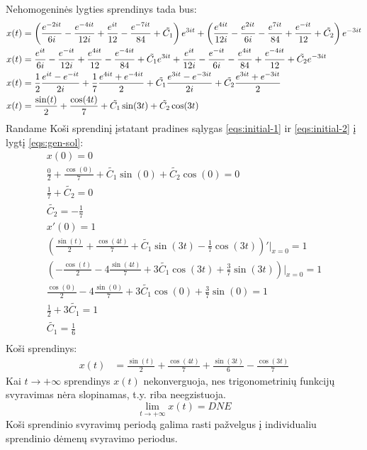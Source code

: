 \documentclass[11pt]{article}
\begin{document}
Nehomogeninės lygties sprendinys tada bus:
\begin{align}
x(t)&=\left(\frac{e^{-2it}}{6i}-\frac{e^{-4it}}{12i}+\frac{e^{it}}{12}-\frac{e^{-7it}}{84}+\tilde{C_1}\right)e^{3it}
+\left(\frac{e^{4it}}{12i}-\frac{e^{2it}}{6i}-\frac{e^{7it}}{84}+\frac{e^{-it}}{12}+\tilde{C_2}\right)e^{-3it}\notag\\
x(t)&=\frac{e^{it}}{6i}-\frac{e^{-it}}{12i}+\frac{e^{4it}}{12}-\frac{e^{-4it}}{84}+\tilde{C_1}e^{3it}
+\frac{e^{it}}{12i}-\frac{e^{-it}}{6i}-\frac{e^{4it}}{84}+\frac{e^{-4it}}{12}+\tilde{C_2}e^{-3it}\notag\\
x(t)&=\frac{1}{2}\frac{e^{it}-e^{-it}}{2i}+\frac{1}{7}\frac{e^{4it}+e^{-4it}}{2}+\tilde{C_1}\frac{e^{3it}-e^{-3it}}{2i}+\tilde{C_2}\frac{e^{3it}+e^{-3it}}{2}\notag\\
x(t)&=\frac{\sin(t)}{2}+\frac{\cos(4t)}{7}+\tilde{C_1}\sin(3t)+\tilde{C_2}\cos(3t)\label{eqs:gen-sol}
\end{align}
Randame Koši sprendinį įstatant pradines sąlygas \eqref{eqs:initial-1} ir \eqref{eqs:initial-2} į lygtį \eqref{eqs:gen-sol}:
\begin{align*}
x(0)=0\\
\frac{0}{2}+\frac{\cos(0)}{7}+\tilde{C_1}\sin(0)+\tilde{C_2}\cos(0)=0\\
\frac{1}{7}+\tilde{C_2}=0\\
\tilde{C_2}=-\frac{1}{7}\\
x'(0)=1\\
\left(\frac{\sin(t)}{2}+\frac{\cos(4t)}{7}+\tilde{C_1}\sin(3t)-\frac{1}{7}\cos(3t)\right)'\Big\vert_{x=0}=1\\
\left(-\frac{\cos(t)}{2}-4\frac{\sin(4t)}{7}+3\tilde{C_1}\cos(3t)+\frac{3}{7}\sin(3t)\right)\Big\vert_{x=0}=1\\
\frac{\cos(0)}{2}-4\frac{\sin(0)}{7}+3\tilde{C_1}\cos(0)+\frac{3}{7}\sin(0)=1\\
\frac{1}{2}+3\tilde{C_1}=1\\
\tilde{C_1}=\frac{1}{6}\\
\end{align*}
Koši sprendinys:
\begin{align}
x(t)&=\frac{\sin(t)}{2}+\frac{\cos(4t)}{7}+\frac{\sin(3t)}{6}-\frac{\cos(3t)}{7}\label{eqs:cauchy-sol}
\end{align} 
Kai $t\to+\infty$ sprendinys $x(t)$ nekonverguoja, nes trigonometrinių funkcijų svyravimas 
nėra slopinamas, t.y. riba neegzistuoja.
$$\lim_{t\to+\infty}x(t)=DNE$$
Koši sprendinio svyravimų periodą galima rasti pažvelgus į individualiu sprendinio dėmenų svyravimo periodus.
\end{document}
